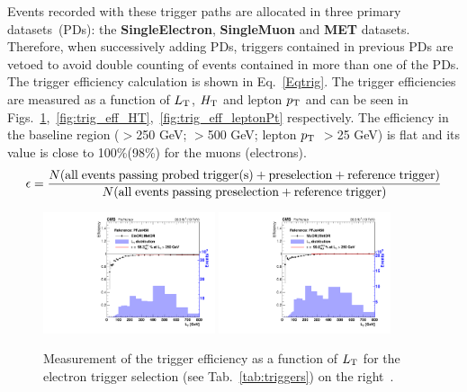 \renewcommand{\arraystretch}{1}
Events recorded with these trigger paths are allocated in three primary datasets~(PDs): the \textbf{SingleElectron}, \textbf{SingleMuon} and \textbf{MET} datasets.
Therefore, when successively adding PDs, triggers contained in previous PDs are vetoed to avoid double counting of events contained in more than one of the PDs. The trigger efficiency calculation is shown in Eq.~\ref{Eqtrig}. The trigger efficiencies are measured as a function of $\LT$, $H_{\rm T}$ and lepton $p_{\rm T}$ and can be seen in Figs.~\ref{fig:trig_eff_LT},~\ref{fig:trig_eff_HT},~\ref{fig:trig_eff_leptonPt} respectively.
The efficiency in the baseline region (\LT$>$250 GeV; \HT$>$500 GeV; lepton $p_{\rm T}$ $>$25 GeV) is flat and its value is close to 100\%(98\%) for the muons (electrons).
\begin{equation}
\label{Eqtrig}
  \epsilon = \frac{N({\rm all \; events \; passing \; probed \; trigger(s) +
  preselection + reference \; trigger})}{N({\rm all \; events \; passing
  \;preselection + reference \; trigger})}
\end{equation}
\begin{figure}[!h]
  \begin{center}
    \includegraphics[width=0.45\textwidth]{Plots/trigger/LT_PFJet450_EffFit_test_HLT_EleORORHLT_MetOR.pdf}
    \includegraphics[width=0.45\textwidth]{Plots/trigger/LT_PFJet450_EffFit_test_HLT_MuORORHLT_MetOR.pdf}
  \end{center}
  \caption[The trigger efficiency as a function of $\LT$]{Measurement of the trigger efficiency as a function of $\LT$ for the electron trigger selection (see Tab.~\ref{tab:triggers}) on the right~\cite{trigger}.
  \label{fig:trig_eff_LT}}
  \end{figure}

